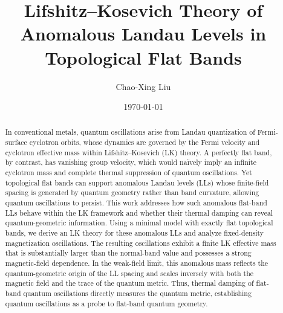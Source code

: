 \documentclass[prl,twocolumn,superscriptaddress,float,aps]{revtex4-2}
\begin{document}
\title{Lifshitz--Kosevich Theory of Anomalous Landau Levels in Topological Flat Bands}
\author{Chao-Xing Liu}
\date{\today}

\begin{abstract}
	In conventional metals, quantum oscillations arise from Landau quantization of Fermi-surface cyclotron orbits, whose dynamics are governed by the Fermi velocity and cyclotron effective mass within Lifshitz--Kosevich (LK) theory. A perfectly flat band, by contrast, has vanishing group velocity, which would na\"ively imply an infinite cyclotron mass and complete thermal suppression of quantum oscillations. Yet topological flat bands can support anomalous Landau levels (LLs) whose finite-field spacing is generated by quantum geometry rather than band curvature, allowing quantum oscillations to persist. This work addresses how such anomalous flat-band LLs behave within the LK framework and whether their thermal damping can reveal quantum-geometric information. Using a minimal model with exactly flat topological bands, we derive an LK theory for these anomalous LLs and analyze fixed-density magnetization oscillations. The resulting oscillations exhibit a finite LK effective mass that is substantially larger than the normal-band value and possesses a strong magnetic-field dependence. In the weak-field limit, this anomalous mass reflects the quantum-geometric origin of the LL spacing and scales inversely with both the magnetic field and the trace of the quantum metric. Thus, thermal damping of flat-band quantum oscillations directly measures the quantum metric, establishing quantum oscillations as a probe to flat-band quantum geometry.

\end{abstract}
\end{document}
